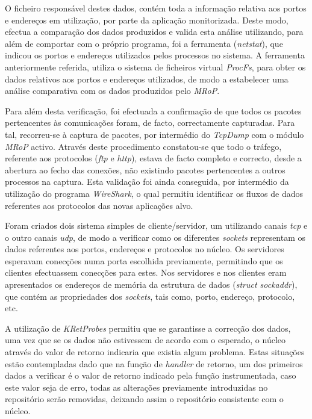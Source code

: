 O ficheiro responsável destes dados, contém toda a informação relativa aos portos e endereços em utilização, por parte da aplicação monitorizada.
Deste modo, efectua a comparação dos dados produzidos e valida esta análise utilizando, para além de comportar com o próprio programa, foi a ferramenta (\textit{netstat}), que indicou os portos e endereços utilizados pelos processos no sistema.
A ferramenta anteriormente referida, utiliza o sistema de ficheiros virtual \textit{ProcFs}, para obter os dados relativos aos portos e endereços utilizados,  de modo a estabelecer uma análise comparativa com os dados produzidos pelo \textit{MRoP}.

Para além desta verificação, foi efectuada a confirmação de que todos os pacotes pertencentes às comunicações foram, de facto, correctamente capturadas.
Para tal, recorreu-se à captura de pacotes, por intermédio do \textit{TcpDump} com o módulo \textit{MRoP} activo.
Através deste procedimento constatou-se que todo o tráfego, referente aos protocolos (\textit{ftp} e \textit{http}), estava de facto completo e correcto, desde a abertura ao fecho das conexões, não existindo pacotes pertencentes a outros processos na captura.
Esta validação foi ainda conseguida, por intermédio da utilização do programa \textit{WireShark}, o qual permitiu identificar os fluxos de dados referentes aos protocolos das novas aplicações alvo.


Foram criados dois sistema simples de cliente/servidor, um utilizando canais \textit{tcp} e o outro canais \textit{udp}, de modo a verificar como os diferentes \textit{sockets} representam os dados referentes aos portos, endereços e protocolos no núcleo.
Os servidores esperavam conecções numa porta escolhida previamente, permitindo que os clientes efectuassem conecções para estes.
Nos servidores e nos clientes eram apresentados os endereços de memória da estrutura de dados (\textit{struct sockaddr}), que contém as propriedades dos \textit{sockets}, tais como, porto, endereço, protocolo, etc.

A utilização de \textit{KRetProbes} permitiu que se garantisse a correcção dos dados, uma vez que se os dados não estivessem de acordo com o esperado, o núcleo através do valor de retorno indicaria que existia algum problema.
Estas situações estão contempladas dado que na função de \textit{handler} de retorno, um dos primeiros dados a verificar é o valor de retorno indicado pela função instrumentada, caso este valor seja de erro, todas as alterações previamente introduzidas no repositório serão removidas, deixando assim o repositório consistente com o núcleo.

